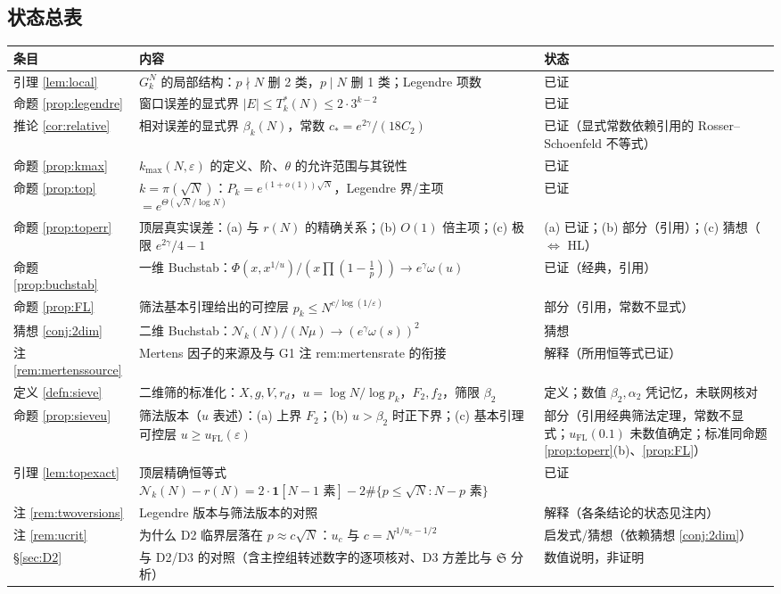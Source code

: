 \documentclass[11pt,a4paper]{article}
\newcommand{\Haar}{\mu}
\newcommand{\Sing}{\mathfrak S}
\newcommand{\Cnt}{\mathcal N}          %
\newcommand{\Tmix}{T^{*}}               %
\newcommand{\kmax}{k_{\max}}
\theoremstyle{plain}
\theoremstyle{definition}
\begin{document}
\begin{CJK}{UTF8}{gbsn}
\section*{状态总表}
\begin{center}
\begin{tabular}{p{2.6cm}p{7.6cm}p{4.2cm}}
\hline
条目 & 内容 & 状态\\
\hline
引理 \ref{lem:local} & $G_k^N$ 的局部结构：$p\nmid N$ 删 2 类，$p\mid N$ 删 1 类；Legendre 项数 & 已证\\
命题 \ref{prop:legendre} & 窗口误差的显式界 $|E|\le\Tmix_k(N)\le2\cdot3^{k-2}$ & 已证\\
推论 \ref{cor:relative} & 相对误差的显式界 $\beta_k(N)$，常数 $c_*=e^{2\gamma}/(18C_2)$ & 已证（显式常数依赖引用的 Rosser--Schoenfeld 不等式）\\
命题 \ref{prop:kmax} & $\kmax(N,\varepsilon)$ 的定义、阶、$\theta$ 的允许范围与其锐性 & 已证\\
命题 \ref{prop:top} & $k=\pi(\sqrt N)$：$P_k=e^{(1+o(1))\sqrt N}$，Legendre 界/主项 $=e^{\Theta(\sqrt N/\log N)}$ & 已证\\
命题 \ref{prop:toperr} & 顶层真实误差：(a) 与 $r(N)$ 的精确关系；(b) $O(1)$ 倍主项；(c) 极限 $e^{2\gamma}/4-1$ & (a) 已证；(b) 部分（引用）；(c) 猜想（$\Leftrightarrow$ HL）\\
命题 \ref{prop:buchstab} & 一维 Buchstab：$\Phi(x,x^{1/u})/(x\prod(1-\frac1p))\to e^\gamma\omega(u)$ & 已证（经典，引用）\\
命题 \ref{prop:FL} & 筛法基本引理给出的可控层 $p_k\le N^{c/\log(1/\varepsilon)}$ & 部分（引用，常数不显式）\\
猜想 \ref{conj:2dim} & 二维 Buchstab：$\Cnt_k(N)/(N\Haar)\to(e^\gamma\omega(s))^2$ & 猜想\\
注 \ref{rem:mertenssource} & Mertens 因子的来源及与 G1 注 rem:mertensrate 的衔接 & 解释（所用恒等式已证）\\
定义 \ref{defn:sieve} & 二维筛的标准化：$X,g,V,r_d$，$u=\log N/\log p_k$，$F_2,f_2$，筛限 $\beta_2$ & 定义；数值 $\beta_2,\alpha_2$ 凭记忆，未联网核对\\
命题 \ref{prop:sieveu} & 筛法版本（$u$ 表述）：(a) 上界 $F_2$；(b) $u>\beta_2$ 时正下界；(c) 基本引理可控层 $u\ge u_{\mathrm{FL}}(\varepsilon)$ & 部分（引用经典筛法定理，常数不显式；$u_{\mathrm{FL}}(0.1)$ 未数值确定；标准同命题 \ref{prop:toperr}(b)、\ref{prop:FL}）\\
引理 \ref{lem:topexact} & 顶层精确恒等式 $\Cnt_k(N)-r(N)=2\cdot\mathbf 1[N-1\text{ 素}]-2\#\{p\le\sqrt N:N-p\text{ 素}\}$ & 已证\\
注 \ref{rem:twoversions} & Legendre 版本与筛法版本的对照 & 解释（各条结论的状态见注内）\\
注 \ref{rem:ucrit} & 为什么 D2 临界层落在 $p\approx c\sqrt N$：$u_c$ 与 $c=N^{1/u_c-1/2}$ & 启发式/猜想（依赖猜想 \ref{conj:2dim}）\\
\S\ref{sec:D2} & 与 D2/D3 的对照（含主控组转述数字的逐项核对、D3 方差比与 $\Sing$ 分析） & 数值说明，非证明\\
\hline
\end{tabular}
\end{center}


\end{CJK}
\end{document}
